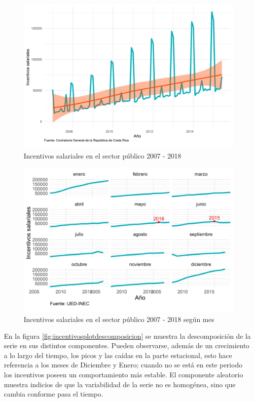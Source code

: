 \documentclass[
]{article}
\begin{document}
\begin{figure}[H]
\includegraphics[width=1\linewidth,height=1\textheight]{Tesis_files/figure-latex/incentivosplotgeneral-1} \caption{Incentivos salariales en el sector público 2007 - 2018}\label{fig:incentivosplotgeneral}
\end{figure}

\begin{figure}[H]
\includegraphics[width=1\linewidth,height=1\textheight]{Tesis_files/figure-latex/incentivosplotperiodos-1} \caption{Incentivos salariales en el sector público 2007 - 2018 según mes}\label{fig:incentivosplotperiodos}
\end{figure}

En la figura \ref{fig:incentivosplotdescomposicion} se muestra la
descomposición de la serie en sus distintos componentes. Pueden
observarse, además de un crecimiento a lo largo del tiempo, los picos y
las caídas en la parte estacional, esto hace referencia a los meses de
Diciembre y Enero; cuando no se está en este periodo los incentivos
poseen un comportamiento más estable. El componente aleatorio muestra
indicios de que la variabilidad de la serie no es homogénea, sino que
cambia conforme pasa el tiempo.
\end{document}
